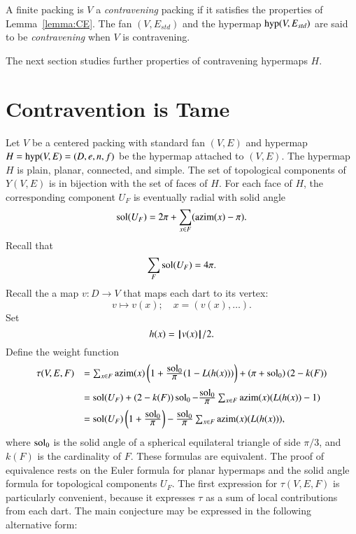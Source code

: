\begin{definition}[contravening]
A finite packing is $V$ a {\it contravening} packing if it satisfies the properties
of Lemma~\ref{lemma:CE}.  The fan $(V,E_{std})$ and the hypermap ${\operatorname{hyp}}(V,E_{std})$ are said
to be {\it contravening} when $V$ is contravening.
%
%
\end{definition}



The next section studies further properties of contravening hypermaps $H$.



\section{Contravention is Tame}
%
    \label{sec:contraproof}

Let $V$ be a centered packing with
standard fan $(V,E)$ and hypermap $H={\operatorname{hyp}}(V,E)=(D,e,n,f)$
be the hypermap attached to $(V,E)$.
The hypermap $H$ is plain, planar, connected, and simple.
The set of topological components of $Y(V,E)$ is in bijection with
the set of faces of $H$.  
%
For each face of $H$, the corresponding component $U_F$
is eventually radial with solid
angle
%
  $$
  \operatorname{sol}(U_F) = 2\pi + \sum_{x\in F} ({\operatorname{azim}}(x) -\pi).
  $$
Recall that
    $$\sum_{F} \operatorname{sol}(U_F) = 4\pi.$$
Recall the a map $v:D\to V$ that maps each dart to its vertex:
$$
v \mapsto v(x); \quad   x = (v(x),\ldots).
$$
Set 
$$h(x) = {{\hskip0.1em|\hskip-0.15em|\hskip0.1em}v(x){\hskip0.1em|\hskip-0.15em|\hskip0.1em}}/2.$$
Define the weight function
\begin{equation}
\begin{array}{lll}
\tau(V,E,F) &=\sum_{x\in F} \op{azim}(x)\left(1 + \dfrac{\sol_0}{\pi}(1- L(h(x)))\right) + \left(\pi+{\sol_0}\right) (2- k(F))\vspace{6pt}\\
  &= \sol(U_F) + (2- k(F))\sol_0 - \dfrac{\sol_0}{\pi}\sum_{x\in F}\op{azim}(x) (L(h(x)) - 1)\vspace{6pt}\\
&= \sol(U_F) \left( 1 + \dfrac{\sol_0}{\pi}\right) - \dfrac{\sol_0}{\pi} \sum_{x\in F} \op{azim}(x)(L(h(x))),\\
\end{array}
\end{equation}
where $\operatorname{sol}_0$ is the solid angle of a spherical equilateral triangle of side $\pi/3$, and $k(F)$ is the cardinality of $F$.
% 
These formulas are equivalent.  The proof of equivalence rests on the Euler formula for planar hypermaps and the solid angle formula for topological components $U_F$.
The first expression for $\tau(V,E,F)$ is particularly convenient, because it expresses $\tau$ as a sum of local contributions from each dart.
%
%
%
The main conjecture may be expressed in the following alternative form:

